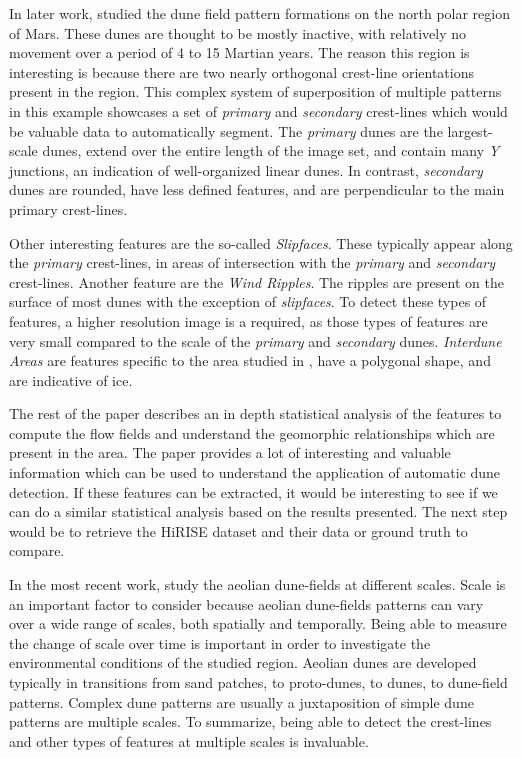In later work, \cite{Ewing_Peyret_Kocurek_Bourke} studied the dune field pattern formations on the north polar region of Mars. These dunes are thought to be mostly inactive, with relatively no movement over a period of 4 to 15 Martian years. The reason this region is interesting is because there are two nearly orthogonal crest-line orientations present in the region. This complex system of superposition of multiple patterns in this example showcases a set of \emph{primary} and \emph{secondary} crest-lines which would be valuable data to automatically segment. The \emph{primary}	dunes are the largest-scale dunes, extend over the entire length of the image set, and contain many \emph{Y} junctions, an indication of well-organized linear dunes. In contrast, \emph{secondary} dunes are rounded, have less defined features, and are perpendicular to the main primary crest-lines.

Other interesting features are the so-called \emph{Slipfaces}. These typically appear along the \emph{primary} crest-lines, in areas of intersection with the \emph{primary} and \emph{secondary} crest-lines. Another feature are the \emph{Wind Ripples}. The ripples are present on the surface of most dunes with the exception	of \emph{slipfaces}. To detect	these types of features, a higher resolution image is a required, as those types of features are very small compared to the scale of the \emph{primary} and \emph{secondary}	dunes. \emph{Interdune Areas} are features specific to the area studied in \cite{Ewing_Peyret_Kocurek_Bourke},	have a polygonal shape, and are indicative of ice.

The rest of the paper describes an in depth statistical analysis of the features to compute the flow fields and understand the geomorphic relationships which are present in the area. The paper \cite{Ewing_Peyret_Kocurek_Bourke} provides a lot of interesting and valuable information which can be used to understand the application of automatic dune detection. If these features can be extracted, it would be interesting to see if we can do a similar statistical analysis based on the results presented. The next step would be to retrieve the HiRISE dataset and their data or ground truth to compare.

In the most recent work, \cite{Multi_spatial_analysis_aeolian_dune_field_patterns} study the aeolian dune-fields at different scales. Scale is an important factor to consider because aeolian dune-fields patterns can vary over	a wide range of scales, both spatially and temporally. Being able to measure the change of scale over time is important in order to investigate the environmental conditions of the studied region. Aeolian	dunes are developed typically in transitions from sand patches, to proto-dunes, to dunes, to dune-field patterns. Complex dune patterns are usually a juxtaposition of simple dune patterns are multiple scales. To summarize, being able to detect the crest-lines and other types of features at multiple scales is invaluable.

